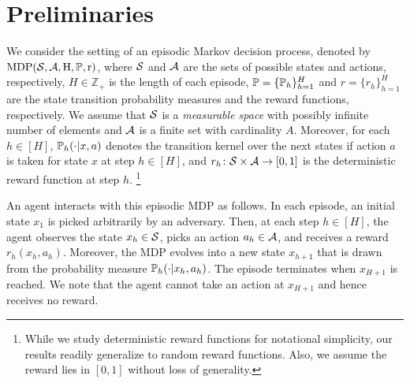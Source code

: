 

\section{Preliminaries}

We consider the setting of an episodic Markov decision process, denoted by $\rm{MDP}(\cS, \cA, H, \P, r)$, where 
$\cS$ and $\cA$ are the sets of possible states and actions, respectively, 
$H \in \mathbb{Z_{+}}$ is the length of each episode,
$\P = \{ \P_h \}_{h=1}^H $ and $ r = \{ r_h \}_{h=1}^H $  are the  state transition probability measures and the reward functions,  respectively.
We assume that   $\cS$ is a  \emph{measurable space}  with possibly infinite number of elements and $\cA $ is a finite set with cardinality $A $. Moreover, for each $h \in [ H]$, $\P_h ( \cdot | x, a) $ denotes the transition kernel 
over the next states if action $a$ is taken for state $x$ at step $h\in [H]$, and $r_h \colon \cS \times \cA \to [0,1]$ is the deterministic reward function at step $h$.%
\footnote{While we study deterministic reward functions for notational simplicity, our results readily generalize to random  reward functions. Also, we assume the reward lies in $[0,1]$ without loss of generality.}


An agent interacts with this episodic MDP as follows. In each episode, an initial state $x_1$ is   picked arbitrarily by an adversary. 
Then, at each step $h \in [H]$, the agent observes the state $x_h \in \cS$, picks an action $a_h \in \cA$, and receives a reward $r_h(x_h, a_h)$. Moreover, the MDP evolves into a new state  $x_{h+1}$  that 
is drawn from the probability measure $\P_h(\cdot | x_h, a_h)$. The episode terminates when $x_{H+1}$ is reached. We note that the agent cannot take an action at $x_{H+1}$ and hence receives no reward.

 
% 


